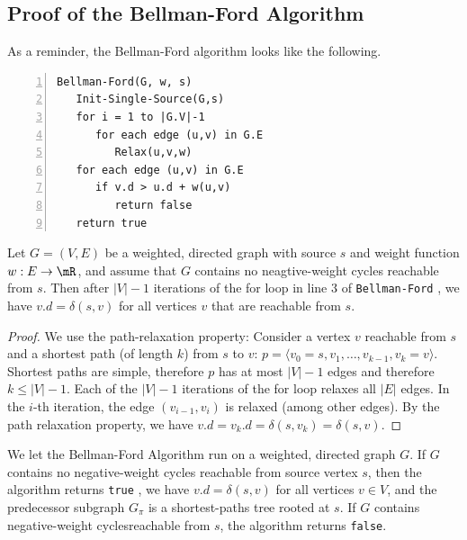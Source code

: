 
\subsection{Proof of the Bellman-Ford Algorithm}

As a reminder, the Bellman-Ford algorithm looks like the following.

\begin{Verbatim}[numbers=left, xleftmargin=5mm]
Bellman-Ford(G, w, s)
   Init-Single-Source(G,s)
   for i = 1 to |G.V|-1
      for each edge (u,v) in G.E
         Relax(u,v,w)
   for each edge (u,v) in G.E
      if v.d > u.d + w(u,v)
         return false
   return true
\end{Verbatim}


\begin{theorem} Let $G = (V,E)$ be a weighted, directed graph with source $s$ and weight function $w: E \rightarrow \mR$, and assume that $G$ contains no neagtive-weight cycles reachable from $s$. Then after $|V|-1$ iterations of the for loop in line $3$ of \verb|Bellman-Ford| , we have $v.d = \delta(s,v)$ for all vertices $v$ that are reachable from $s$.
\end{theorem}

\begin{proof} We use the path-relaxation property: Consider a vertex $v$ reachable from $s$ and a shortest path (of length $k$) from $s$ to $v$: $p = \langle v_0 = s, v_1, \ldots, v_{k-1}, v_k = v \rangle$. Shortest paths are simple, therefore $p$ has at most $|V|-1$ edges and therefore $k \leq |V| -1$.  Each of the $|V|-1$ iterations of the for loop relaxes all $|E|$ edges. In the $i$-th iteration, the edge $(v_{i-1},v_i)$ is relaxed (among other edges). By the path relaxation property, we have $v.d = v_k.d = \delta(s, v_k) = \delta(s,v)$.
\end{proof}


\begin{theorem} We let the Bellman-Ford Algorithm run on a weighted, directed graph $G$. If $G$ contains no negative-weight cycles reachable from source vertex $s$, then the algorithm returns \verb|true| , we have $v.d = \delta(s, v)$ for all vertices $v \in V$, and the predecessor subgraph $G_\pi$ is a shortest-paths tree rooted at $s$. If $G$ contains negative-weight cyclesreachable from $s$, the algorithm returns \verb|false|.
\end{theorem}

